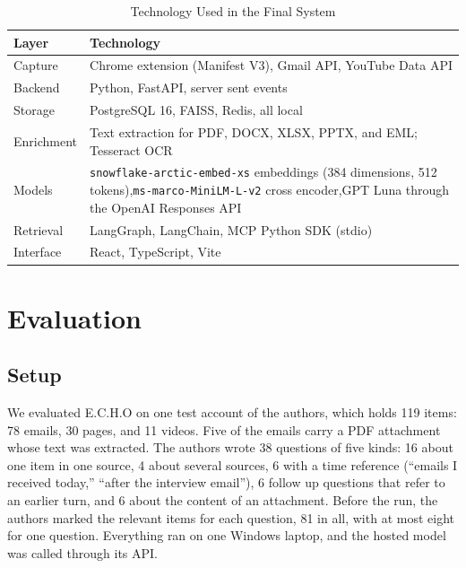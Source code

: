 \documentclass[conference]{IEEEtran}
\newcommand{\embmodel}{\texttt{snowflake\allowbreak-arctic\allowbreak-embed\allowbreak-xs}}
\newcommand{\embdim}{384}
\newcommand{\rerankmodel}{\texttt{ms\allowbreak-marco\allowbreak-MiniLM\allowbreak-L\allowbreak-6\allowbreak-v2}}
\newcommand{\llmname}{GPT\nobreakdash-6 Luna}
\begin{document}
\begin{table}[t]
\caption{Technology Used in the Final System}
\label{tab:stack}
\centering
\renewcommand{\arraystretch}{1.15}
\begin{tabular}{|>{\raggedright\arraybackslash}p{2.0cm}|>{\raggedright\arraybackslash}p{5.55cm}|}
\hline
\textbf{Layer} & \textbf{Technology} \\
\hline
Capture & Chrome extension (Manifest V3), Gmail API, YouTube Data API \\
\hline
Backend & Python, FastAPI, server sent events \\
\hline
Storage & PostgreSQL 16, FAISS, Redis, all local \\
\hline
Enrichment & Text extraction for PDF, DOCX, XLSX, PPTX, and EML; Tesseract OCR \\
\hline
Models & \embmodel{} embeddings (\embdim{} dimensions, 512 tokens),\newline \rerankmodel{} cross encoder,\newline \llmname{} through the OpenAI Responses API \\
\hline
Retrieval & LangGraph, LangChain, MCP Python SDK (stdio) \\
\hline
Interface & React, TypeScript, Vite \\
\hline
\end{tabular}
\end{table}

\section{Evaluation}\label{sec:eval}
\subsection{Setup}
We evaluated E.C.H.O on one test account of the authors, which holds 119 items: 78 emails, 30 pages, and 11 videos. Five of the emails carry a PDF attachment whose text was extracted. The authors wrote 38 questions of five kinds: 16 about one item in one source, 4 about several sources, 6 with a time reference (``emails I received today,'' ``after the interview email''), 6 follow up questions that refer to an earlier turn, and 6 about the content of an attachment. Before the run, the authors marked the relevant items for each question, 81 in all, with at most eight for one question. Everything ran on one Windows laptop, and the hosted model was called through its API.
\end{document}
